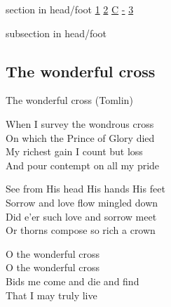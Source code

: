 \documentclass{beamer}
\begin{document}
{
{ 
 {
 \begin{beamercolorbox}[ht=4.5ex,dp=1.5ex,%
      leftskip=.3cm,rightskip=.3cm plus1fil]{section in head/foot}
 \fontsize{12}{25}\selectfont 
\hyperlink{The wonderful cross['When I survey'](Tomlin)1}{1}
\hyperlink{The wonderful cross['When I survey'](Tomlin)2}{2}
\hyperlink{The wonderful cross['When I survey'](Tomlin)C}{C}
\hyperlink{The wonderful cross['When I survey'](Tomlin)-}{-}
\hyperlink{The wonderful cross['When I survey'](Tomlin)3}{3}
 
 \end{beamercolorbox}%
  \begin{beamercolorbox}[ht=2.5ex,dp=1.125ex,%
   leftskip=.3cm,rightskip=.3cm plus1fil]{subsection in head/foot}
   \insertauthor
 \end{beamercolorbox}%
 }
}
\subsection{ The wonderful cross }

\hypertarget{The wonderful cross['When I survey'](Tomlin)1}{}
\begin{frame}{The wonderful cross (Tomlin)}
\fontsize{ 20 }{ 27 }\selectfont

When I survey the wondrous cross\\ 
On which the Prince of Glory died\\ 
My richest gain I count but loss\\ 
And pour contempt on all my pride 

\end{frame}

\hypertarget{The wonderful cross['When I survey'](Tomlin)2}{}
\begin{frame}{}
\fontsize{ 20 }{ 27 }\selectfont

See from His head His hands His feet\\ 
Sorrow and love flow mingled down\\ 
Did e'er such love and sorrow meet\\ 
Or thorns compose so rich a crown 

\end{frame}

\hypertarget{The wonderful cross['When I survey'](Tomlin)C}{}
\begin{frame}{}
\fontsize{ 20 }{ 27 }\selectfont

O the wonderful cross\\ 
O the wonderful cross\\ 
Bids me come and die and find\\ 
That I may truly live 


\end{frame}}
\end{document}
